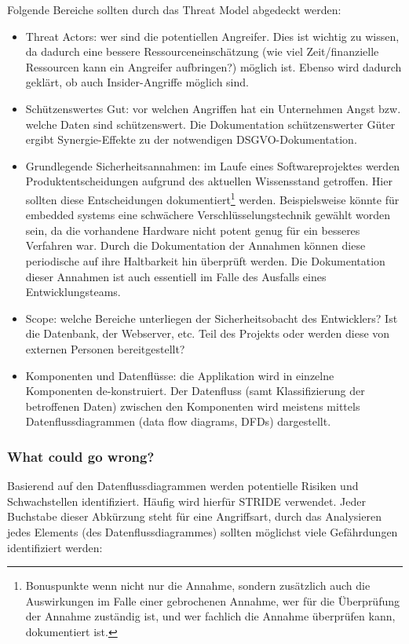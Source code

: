 Folgende Bereiche sollten durch das Threat Model abgedeckt werden:

\begin{itemize}
	\item Threat Actors: wer sind die potentiellen Angreifer. Dies ist wichtig zu wissen, da dadurch eine bessere Ressourceneinschätzung (wie viel Zeit/finanzielle Ressourcen kann ein Angreifer aufbringen?) möglich ist. Ebenso wird dadurch geklärt, ob auch Insider-Angriffe möglich sind.
	\item Schützenswertes Gut: vor welchen Angriffen hat ein Unternehmen Angst bzw. welche Daten sind schützenswert. Die Dokumentation schützenswerter Güter ergibt Synergie-Effekte zu der notwendigen DSGVO-Dokumentation.
	\item Grundlegende Sicherheitsannahmen: im Laufe eines Softwareprojektes werden Produktentscheidungen aufgrund des aktuellen Wissensstand getroffen. Hier sollten diese Entscheidungen dokumentiert\footnote{Bonuspunkte wenn nicht nur die Annahme, sondern zusätzlich auch die Auswirkungen im Falle einer gebrochenen Annahme, wer für die Überprüfung der Annahme zuständig ist, und wer fachlich die Annahme überprüfen kann, dokumentiert ist.} werden. Beispielsweise könnte für embedded systems eine schwächere Verschlüsselungstechnik gewählt worden sein, da die vorhandene Hardware nicht potent genug für ein besseres Verfahren war. Durch die Dokumentation der Annahmen können diese periodische auf ihre Haltbarkeit hin überprüft werden. Die Dokumentation dieser Annahmen ist auch essentiell im Falle des Ausfalls eines Entwicklungsteams.
	\item Scope: welche Bereiche unterliegen der Sicherheitsobacht des Entwicklers? Ist die Datenbank, der Webserver, etc. Teil des Projekts oder werden diese von externen Personen bereitgestellt?
	\item Komponenten und Datenflüsse: die Applikation wird in einzelne Komponenten de-konstruiert. Der Datenfluss (samt Klassifizierung der betroffenen Daten) zwischen den Komponenten wird meistens mittels Datenflussdiagrammen (data flow diagrams, DFDs) dargestellt.
\end{itemize}

\subsubsection{What could go wrong?}

Basierend auf den Datenflussdiagrammen werden potentielle Risiken und Schwachstellen identifiziert. Häufig wird hierfür STRIDE verwendet. Jeder Buchstabe dieser Abkürzung steht für eine Angriffsart, durch das Analysieren jedes Elements (des Datenflussdiagrammes) sollten möglichst viele Gefährdungen identifiziert werden:

